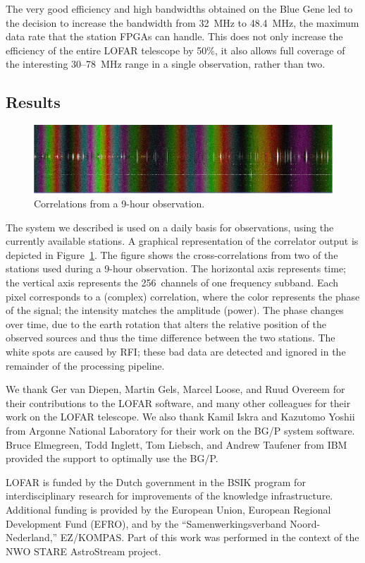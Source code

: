 The very good efficiency and high bandwidths obtained on the Blue Gene led
to the decision to increase the bandwidth from 32~MHz to 48.4~MHz, the
maximum data rate that the station FPGAs can handle.
This does not only increase the efficiency of the entire LOFAR telescope
by 50\%, it also allows full coverage of the interesting 30--78~MHz range
in a single observation, rather than two.


\subsection{Results}

\begin{figure}[ht]
\includegraphics[width=\columnwidth]{fringe.jpg}
\caption{Correlations from a 9-hour observation.}
\label{fig:fringe}
\end{figure}

The system we described is used on a daily basis for observations, using the
currently available stations.
A graphical representation of the correlator output is depicted in
Figure~\ref{fig:fringe}.
The figure shows the cross-correlations from two of the stations used during a
9-hour observation.
The horizontal axis represents time;
the vertical axis represents the 256~channels of one frequency subband.
Each pixel corresponds to a (complex) correlation, where the color represents
the phase of the signal; the intensity matches the amplitude (power).
The phase changes over time, due to the earth rotation that alters the
relative position of the observed sources and thus the time difference
between the two stations.
The white spots are caused by RFI; these bad data are detected and
ignored in the remainder of the processing pipeline.



\begin{acknowledgements}
We thank Ger van Diepen, Martin Gels, Marcel Loose, and Ruud Overeem
for their contributions to the LOFAR software, and many other colleagues
for their work on the LOFAR telescope.
We also thank Kamil Iskra and Kazutomo Yoshii from Argonne National Laboratory
for their work on the BG/P system software.
Bruce Elmegreen, Todd Inglett, Tom Liebsch, and Andrew Taufener from IBM
provided the support to optimally use the BG/P.

LOFAR is funded by the Dutch government in the BSIK program for
interdisciplinary research for improvements of the knowledge
infrastructure.  Additional funding is provided by the European Union,
European Regional Development Fund (EFRO), and by the
``Samenwerkingsverband Noord-Nederland,'' EZ/KOMPAS. Part of this work was
performed in the context of the NWO STARE AstroStream project.
\end{acknowledgements}


%





